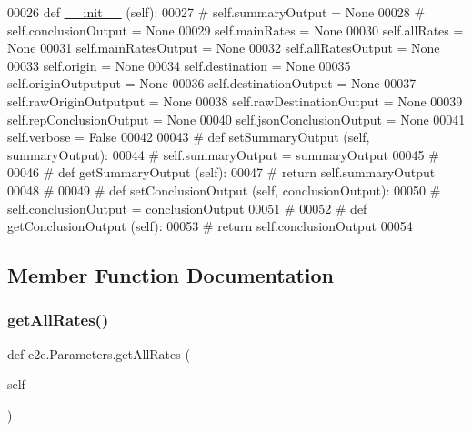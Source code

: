 \begin{DoxyCode}
00026     \textcolor{keyword}{def }\hyperlink{namespacestart__time_a9c9bd378729a13c96a22c8b079ea172c}{\_\_init\_\_} (self):
00027 \textcolor{comment}{#        self.summaryOutput        = None}
00028 \textcolor{comment}{#        self.conclusionOutput     = None}
00029         self.mainRates            = \textcolor{keywordtype}{None}
00030         self.allRates             = \textcolor{keywordtype}{None}
00031         self.mainRatesOutput      = \textcolor{keywordtype}{None}
00032         self.allRatesOutput       = \textcolor{keywordtype}{None}
00033         self.origin               = \textcolor{keywordtype}{None}
00034         self.destination          = \textcolor{keywordtype}{None}
00035         self.originOutputput      = \textcolor{keywordtype}{None}
00036         self.destinationOutput    = \textcolor{keywordtype}{None}
00037         self.rawOriginOutputput   = \textcolor{keywordtype}{None}
00038         self.rawDestinationOutput = \textcolor{keywordtype}{None}
00039         self.repConclusionOutput  = \textcolor{keywordtype}{None}
00040         self.jsonConclusionOutput = \textcolor{keywordtype}{None}
00041         self.verbose              = \textcolor{keyword}{False}
00042 
00043 \textcolor{comment}{#    def setSummaryOutput (self, summaryOutput):}
00044 \textcolor{comment}{#        self.summaryOutput = summaryOutput}
00045 \textcolor{comment}{#}
00046 \textcolor{comment}{#    def getSummaryOutput (self):}
00047 \textcolor{comment}{#        return self.summaryOutput}
00048 \textcolor{comment}{#}
00049 \textcolor{comment}{#    def setConclusionOutput (self, conclusionOutput):}
00050 \textcolor{comment}{#        self.conclusionOutput = conclusionOutput}
00051 \textcolor{comment}{#}
00052 \textcolor{comment}{#    def getConclusionOutput (self):}
00053 \textcolor{comment}{#        return self.conclusionOutput}
00054 
\end{DoxyCode}


\subsection{Member Function Documentation}
\mbox{\label{classe2e_1_1_parameters_a73ef5c8c54974e3ce7a2a522c299fd34}} 
\subsubsection{\texorpdfstring{get\+All\+Rates()}{getAllRates()}}
{\footnotesize\ttfamily def e2e.\+Parameters.\+get\+All\+Rates (\begin{DoxyParamCaption}\item[{}]{self }\end{DoxyParamCaption})}



